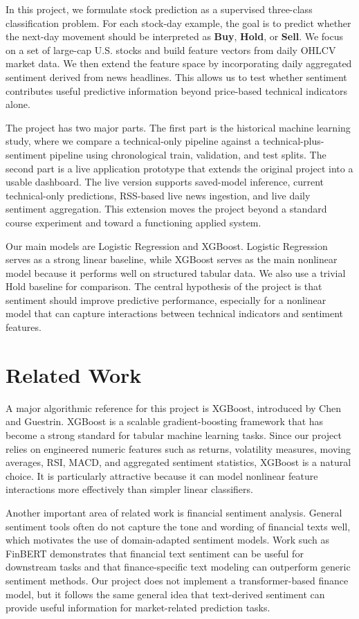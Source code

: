 \documentclass[11pt]{article}
\begin{document}
In this project, we formulate stock prediction as a supervised three-class classification problem. For each stock-day example, the goal is to predict whether the next-day movement should be interpreted as \textbf{Buy}, \textbf{Hold}, or \textbf{Sell}. We focus on a set of large-cap U.S. stocks and build feature vectors from daily OHLCV market data. We then extend the feature space by incorporating daily aggregated sentiment derived from news headlines. This allows us to test whether sentiment contributes useful predictive information beyond price-based technical indicators alone.

The project has two major parts. The first part is the historical machine learning study, where we compare a technical-only pipeline against a technical-plus-sentiment pipeline using chronological train, validation, and test splits. The second part is a live application prototype that extends the original project into a usable dashboard. The live version supports saved-model inference, current technical-only predictions, RSS-based live news ingestion, and live daily sentiment aggregation. This extension moves the project beyond a standard course experiment and toward a functioning applied system.

Our main models are Logistic Regression and XGBoost. Logistic Regression serves as a strong linear baseline, while XGBoost serves as the main nonlinear model because it performs well on structured tabular data. We also use a trivial Hold baseline for comparison. The central hypothesis of the project is that sentiment should improve predictive performance, especially for a nonlinear model that can capture interactions between technical indicators and sentiment features.

\section{Related Work}

A major algorithmic reference for this project is XGBoost, introduced by Chen and Guestrin. XGBoost is a scalable gradient-boosting framework that has become a strong standard for tabular machine learning tasks. Since our project relies on engineered numeric features such as returns, volatility measures, moving averages, RSI, MACD, and aggregated sentiment statistics, XGBoost is a natural choice. It is particularly attractive because it can model nonlinear feature interactions more effectively than simpler linear classifiers.

Another important area of related work is financial sentiment analysis. General sentiment tools often do not capture the tone and wording of financial texts well, which motivates the use of domain-adapted sentiment models. Work such as FinBERT demonstrates that financial text sentiment can be useful for downstream tasks and that finance-specific text modeling can outperform generic sentiment methods. Our project does not implement a transformer-based finance model, but it follows the same general idea that text-derived sentiment can provide useful information for market-related prediction tasks.
\end{document}
